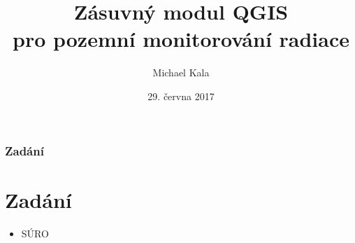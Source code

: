 \documentclass{beamer}
\title{Zásuvný modul QGIS \\ pro pozemní monitorování radiace}
\author{Michael Kala}
\date{29. června 2017}
\begin{document}
\begin{frame}
\titlepage
\end{frame}

\begin{frame}
\frametitle{Zadání}
\section{Zadání}
\begin{itemize}

\item SÚRO

\end{itemize}
\end{frame}
\end{document}
